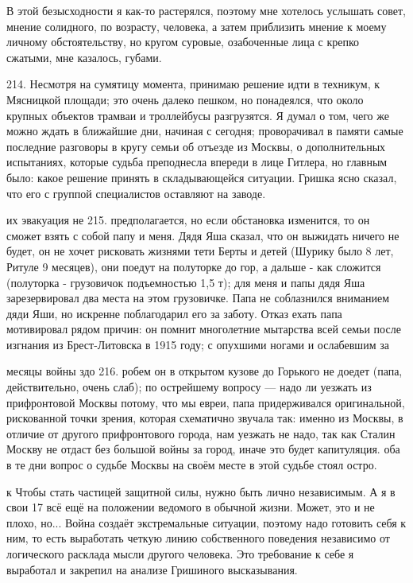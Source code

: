 В этой безысходности я как-то растерялся, поэтому мне хотелось услышать совет, мнение солидного, по возрасту, человека, а затем приблизить мнение к моему личному обстоятельству, но кругом суровые, озабоченные лица с крепко сжатыми, мне казалось, губами.

214. Несмотря на сумятицу момента, принимаю решение идти в техникум, к Мясницкой площади; это очень далеко пешком, но понадеялся, что около крупных объектов трамваи и троллейбусы разгрузятся. Я думал о том, чего же можно ждать в ближайшие дни, начиная с сегодня; проворачивал в памяти самые последние разговоры в кругу семьи об отъезде из Москвы, о дополнительных испытаниях, которые судьба преподнесла впереди в лице Гитлера, но главным было: какое решение принять в складывающейся ситуации. Гришка ясно сказал, что его с группой специалистов оставляют на заводе.

их эвакуация не 215. предполагается, но если обстановка изменится, то он сможет взять с собой папу и меня. Дядя Яша сказал, что он выжидать ничего не будет, он не хочет рисковать жизнями тети Берты и детей (Шурику было 8 лет, Ритуле 9 месяцев), они поедут на полуторке до гор, а дальше - как сложится (полуторка - грузовичок подъемностью 1,5 т); для меня и папы дядя Яша зарезервировал два места на этом грузовичке. Папа не соблазнился вниманием дяди Яши, но искренне поблагодарил его за заботу. Отказ ехать папа мотивировал рядом причин: он помнит многолетние мытарства всей семьи после изгнания из Брест-Литовска в 1915 году; с опухшими ногами и ослабевшим за

месяцы войны здо 216. робем он в открытом кузове до Горького не доедет (папа, действительно, очень слаб); по острейшему вопросу — надо ли уезжать из прифронтовой Москвы потому, что мы евреи, папа придерживался оригинальной, рискованной точки зрения, которая схематично звучала так: именно из Москвы, в отличие от другого прифронтового города, нам уезжать не надо, так как Сталин Москву не отдаст без большой войны за город, иначе это будет капитуляция. оба в те дни вопрос о судьбе Москвы на своём месте в этой судьбе стоял остро.

к Чтобы стать частицей защитной силы, нужно быть лично независимым. А я в свои 17 всё ещё на положении ведомого в обычной жизни. Может, это и не плохо, но... Война создаёт экстремальные ситуации, поэтому надо готовить себя к ним, то есть выработать четкую линию собственного поведения независимо от логического расклада мысли другого человека. Это требование к себе я выработал и закрепил на анализе Гришиного высказывания.

